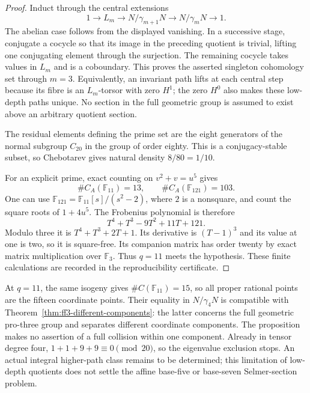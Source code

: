 \begin{proof}
Induct through the central extensions
\[
 1\longrightarrow L_m\longrightarrow N/\gamma_{m+1}N
 \longrightarrow N/\gamma_mN\longrightarrow1.
\]
The abelian case follows from the displayed vanishing.  In a
successive stage, conjugate a cocycle so that its image in the
preceding quotient is trivial, lifting one conjugating element
through the surjection.  The remaining cocycle takes values in
$L_m$ and is a coboundary.  This proves the asserted singleton
cohomology set through $m=3$.  Equivalently, an invariant path lifts
at each central step because its fibre is an $L_m$-torsor with
zero $H^1$; the zero $H^0$ also makes these low-depth paths unique.
No section in the full geometric group is assumed to exist above
an arbitrary quotient section.

The residual elements defining the prime set are the eight generators
of the normal subgroup $C_{20}$ in the group of order eighty.
This is a conjugacy-stable subset, so Chebotarev gives natural
density $8/80=1/10$.

For an explicit prime, exact counting on $v^2+v=u^5$ gives
\[
 \#C_A(\mathbb F_{11})=13,\qquad
 \#C_A(\mathbb F_{121})=103.
\]
One can use $\mathbb F_{121}=\mathbb F_{11}[s]/(s^2-2)$,
where $2$ is a nonsquare, and count the square roots of
$1+4u^5$.  The Frobenius polynomial is therefore
\[
 T^4+T^3-9T^2+11T+121.
\]
Modulo three it is $T^4+T^3+2T+1$.
Its derivative is $(T-1)^3$ and its value at one is two, so it is
square-free.  Its companion matrix has order twenty by exact
matrix multiplication over $\mathbb F_3$.  Thus $q=11$ meets
the hypothesis.  These finite calculations are recorded in the
reproducibility certificate.
\end{proof}

At $q=11$, the same isogeny gives $\#C(\mathbb F_{11})=15$,
so all proper rational points are the fifteen coordinate points.
Their equality in $N/\gamma_4N$ is compatible with
Theorem~\ref{thm:ff3-different-components}: the latter concerns
the full geometric pro-three group and separates different
coordinate components. The proposition makes no assertion of a
full collision within one component. Already in tensor degree four,
$1+1+9+9\equiv0\pmod{20}$, so the eigenvalue exclusion stops.
An actual integral higher-path class remains to be determined;
this limitation of low-depth quotients does not settle the affine
base-five or base-seven Selmer-section problem.
